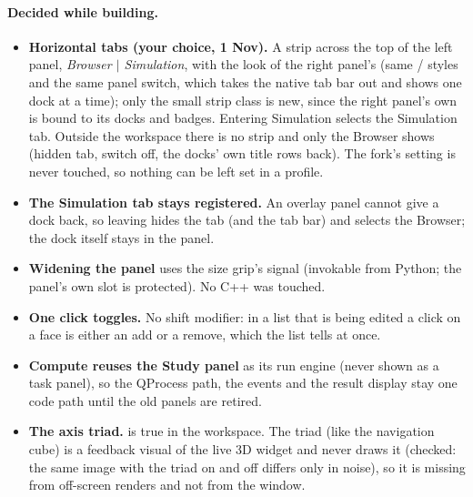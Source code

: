\paragraph{Decided while building.}
\begin{itemize}[nosep]
  \item \textbf{Horizontal tabs (your choice, 1 Nov).} A strip across the top of the left panel, \emph{Browser $|$ Simulation},
        with the look of the right panel's (same  /  styles and the same 
        panel switch, which takes the native tab bar out and shows one dock at a time); only the small strip class is
        new, since the right panel's own is bound to its docks and badges. Entering Simulation selects the Simulation
        tab. Outside the workspace there is no strip and only the Browser shows (hidden tab, switch off, the docks' own title
        rows back). The fork's  setting is never touched, so nothing can be left set in a profile.
  \item \textbf{The Simulation tab stays registered.} An overlay panel cannot give a dock back, so leaving hides the tab (and
        the tab bar) and selects the Browser; the dock itself stays in the panel.
  \item \textbf{Widening the panel} uses the size grip's  signal (invokable from Python; the panel's own slot is
        protected). No C++ was touched.
  \item \textbf{One click toggles.} No shift modifier: in a list that is being edited a click on a face is either an add or a
        remove, which the list tells at once.
  \item \textbf{Compute reuses the Study panel} as its run engine (never shown as a task panel), so the QProcess path, the
        events and the result display stay one code path until the old panels are retired.
  \item \textbf{The axis triad.}  is true in the workspace. The triad (like the navigation cube) is a
        feedback visual of the live 3D widget and  never draws it (checked: the same image with the triad on
        and off differs only in noise), so it is missing from off-screen renders and not from the window.
\end{itemize}

